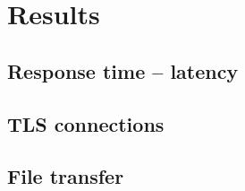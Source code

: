 \chapter{Results}

\section{Response time -- latency}

\section{TLS connections}

\section{File transfer}

